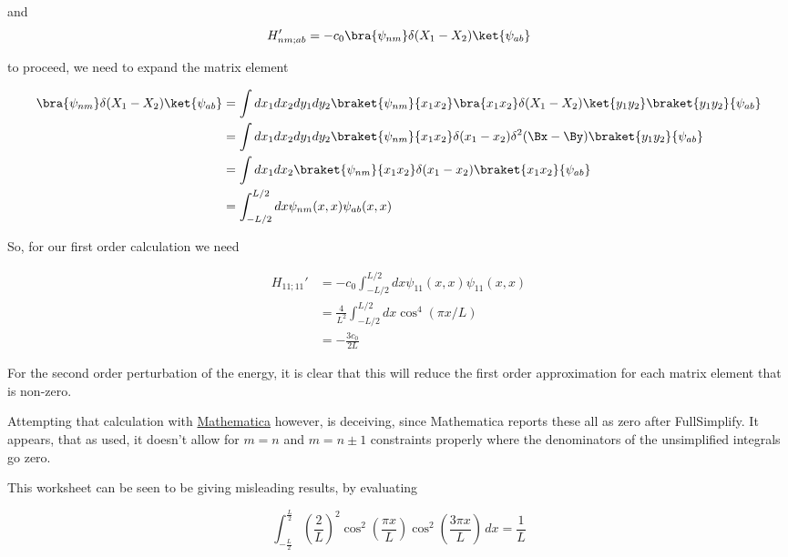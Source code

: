 and
\begin{equation}\label{eqn:qmTwoPs4:410}
H_{nm;ab}' = -c_0 \bra{\psi_{nm}} \delta(X_1 - X_2) \ket{\psi_{ab}}
\end{equation}

to proceed, we need to expand the matrix element

\begin{align*}
\bra{\psi_{nm}} \delta(X_1 - X_2) \ket{\psi_{ab}}
&=
\int dx_1 dx_2 dy_1 dy_2
\braket{\psi_{nm}}{x_1 x_2} \bra{x_1 x_2} \delta(X_1 - X_2) \ket{y_1 y_2 } \braket{y_1 y_2}{\psi_{ab}} \\
&=
\int dx_1 dx_2 dy_1 dy_2
\braket{\psi_{nm}}{x_1 x_2} \delta(x_1 - x_2) \delta^2(\Bx - \By) \braket{y_1 y_2}{\psi_{ab}} \\
&=
\int dx_1 dx_2 
\braket{\psi_{nm}}{x_1 x_2} \delta(x_1 - x_2) \braket{x_1 x_2}{\psi_{ab}} \\
&=
\int_{-L/2}^{L/2} dx
\psi_{nm}(x, x)
\psi_{ab}(x, x)
\end{align*}

So, for our first order calculation we need 

\begin{align*}
H_{11; 11}' 
&= 
- c_0
\int_{-L/2}^{L/2} dx
\psi_{11}(x, x)
\psi_{11}(x, x) \\
&=
\frac{4}{L^2}
\int_{-L/2}^{L/2} dx
\cos^4( \pi x /L ) \\
&=
- \frac{3 c_0}{2 L}
\end{align*}

For the second order perturbation of the energy, it is clear that this will reduce the first order approximation for each matrix element that is non-zero.

Attempting that calculation with \href{https://github.com/peeterjoot/physicsplay/blob/796c8e3739ae1a9ca26270a0e91384afba45661d/notes/phy456/problem\%20set\%204,\%20problem\%202.nb}{Mathematica} however, is deceiving, since Mathematica reports these all as zero after FullSimplify.  It appears, that as used, it doesn't allow for $m = n$ and $m = n \pm 1$ constraints properly where the denominators of the unsimplified integrals go zero.

This worksheet can be seen to be giving misleading results, by evaluating

\begin{equation}\label{eqn:qmTwoPs4:430}
\int_{-\frac{L}{2}}^{\frac{L}{2}} \left(\frac{2}{L}\right)^2 \cos ^2\left(\frac{\pi  x}{L}\right) \cos ^2\left(\frac{3 \pi  x}{L}\right) \, dx = \frac{1}{L}
\end{equation}

